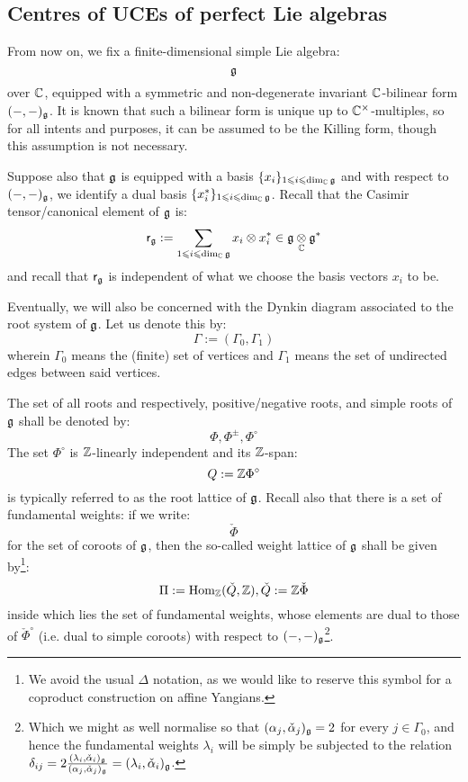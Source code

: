     \subsection{Centres of UCEs of perfect Lie algebras}
        \begin{convention} \label{conv: a_fixed_finite_dimensional_simple_lie_algebra}
            From now on, we fix a finite-dimensional simple Lie algebra:
                $$\mathfrak{g}$$
            over $\mathbb{C}$, equipped with a symmetric and non-degenerate invariant $\mathbb{C}$-bilinear form $(-, -)_{\mathfrak{g}}$. It is known that such a bilinear form is unique up to $\bbC^{\x}$-multiples, so for all intents and purposes, it can be assumed to be the Killing form, though this assumption is not necessary. 
    
            Suppose also that $\mathfrak{g}$ is equipped with a basis $\{x_i\}_{1 \leqslant i \leqslant \dim_{\mathbb{C}} \mathfrak{g}}$ and with respect to $(-, -)_{\mathfrak{g}}$, we identify a dual basis $\{x_i^*\}_{1 \leqslant i \leqslant \dim_{\mathbb{C}} \mathfrak{g}}$. Recall that the Casimir tensor/canonical element of $\mathfrak{g}$ is:
                $$\sfr_{\g} := \sum_{1 \leq i \leq \dim_{\bbC} \g} x_i \tensor x_i^* \in \g \tensor_{\bbC} \g^*$$
            and recall that $\mathsf{r}_{\mathfrak{g}}$ is independent of what we choose the basis vectors $x_i$ to be.
    
            Eventually, we will also be concerned with the Dynkin diagram associated to the root system of $\mathfrak{g}$. Let us denote this by:
                $$\Gamma := (\Gamma_0, \Gamma_1)$$
            wherein $\Gamma_0$ means the (finite) set of vertices and $\Gamma_1$ means the set of undirected edges between said vertices. 
    
            The set of all roots and respectively, positive/negative roots, and simple roots of $\mathfrak{g}$ shall be denoted by:
                $$\Phi, \Phi^{\pm}, \Phi^{\circ}$$
            The set $\Phi^{\circ}$ is $\mathbb{Z}$-linearly independent and its $\mathbb{Z}$-span:
                $$Q := \mathbb{Z} \Phi^{\circ}$$
            is typically referred to as the root lattice of $\mathfrak{g}$. Recall also that there is a set of fundamental weights: if we write:
                $$\check{\Phi}$$
            for the set of coroots of $\mathfrak{g}$, then the so-called weight lattice of $\mathfrak{g}$ shall be given by\footnote{We avoid the usual $\Delta$ notation, as we would like to reserve this symbol for a coproduct construction on affine Yangians.}:
                $$\Pi := \mathrm{Hom}_{\mathbb{Z}}(\check{Q}, \mathbb{Z}), \check{Q} := \mathbb{Z}\check{\Phi}$$
            inside which lies the set of fundamental weights, whose elements are dual to those of $\check{\Phi}^{\circ}$ (i.e. dual to simple coroots) with respect to $(-, -)_{\mathfrak{g}}$\footnote{Which we might as well normalise so that $(\alpha_j, \check{\alpha}_j)_{\mathfrak{g}} = 2$ for every $j \in \Gamma_0$, and hence the fundamental weights $\lambda_i$ will be simply be subjected to the relation $\delta_{ij} = 2 \frac{(\lambda_i, \check{\alpha}_i)_{\mathfrak{g}}}{(\alpha_j, \check{\alpha}_j)_{\mathfrak{g}}} = (\lambda_i, \check{\alpha}_i)_{\mathfrak{g}}$.}.
        \end{convention}